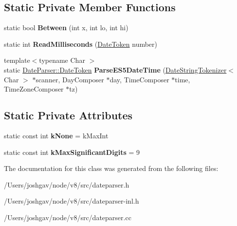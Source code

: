 \subsection*{Static Private Member Functions}
\begin{DoxyCompactItemize}
\item 
static bool {\bfseries Between} (int x, int lo, int hi)\hypertarget{classv8_1_1internal_1_1_date_parser_ab07492829a81d57803a9b2e4320f3a23}{}\label{classv8_1_1internal_1_1_date_parser_ab07492829a81d57803a9b2e4320f3a23}

\item 
static int {\bfseries Read\+Milliseconds} (\hyperlink{structv8_1_1internal_1_1_date_parser_1_1_date_token}{Date\+Token} number)\hypertarget{classv8_1_1internal_1_1_date_parser_ac2b8b095d7795661334e48e111bb868e}{}\label{classv8_1_1internal_1_1_date_parser_ac2b8b095d7795661334e48e111bb868e}

\item 
{\footnotesize template$<$typename Char $>$ }\\static \hyperlink{structv8_1_1internal_1_1_date_parser_1_1_date_token}{Date\+Parser\+::\+Date\+Token} {\bfseries Parse\+E\+S5\+Date\+Time} (\hyperlink{classv8_1_1internal_1_1_date_parser_1_1_date_string_tokenizer}{Date\+String\+Tokenizer}$<$ Char $>$ $\ast$scanner, Day\+Composer $\ast$day, Time\+Composer $\ast$time, Time\+Zone\+Composer $\ast$tz)\hypertarget{classv8_1_1internal_1_1_date_parser_a702f10e026bf1779606ac1ad4846c571}{}\label{classv8_1_1internal_1_1_date_parser_a702f10e026bf1779606ac1ad4846c571}

\end{DoxyCompactItemize}
\subsection*{Static Private Attributes}
\begin{DoxyCompactItemize}
\item 
static const int {\bfseries k\+None} = k\+Max\+Int\hypertarget{classv8_1_1internal_1_1_date_parser_a98be785a6fb973752743c4233f9566a3}{}\label{classv8_1_1internal_1_1_date_parser_a98be785a6fb973752743c4233f9566a3}

\item 
static const int {\bfseries k\+Max\+Significant\+Digits} = 9\hypertarget{classv8_1_1internal_1_1_date_parser_a62edd906db0e9fb2d50c9235cc3406b9}{}\label{classv8_1_1internal_1_1_date_parser_a62edd906db0e9fb2d50c9235cc3406b9}

\end{DoxyCompactItemize}


The documentation for this class was generated from the following files\+:\begin{DoxyCompactItemize}
\item 
/\+Users/joshgav/node/v8/src/dateparser.\+h\item 
/\+Users/joshgav/node/v8/src/dateparser-\/inl.\+h\item 
/\+Users/joshgav/node/v8/src/dateparser.\+cc\end{DoxyCompactItemize}
